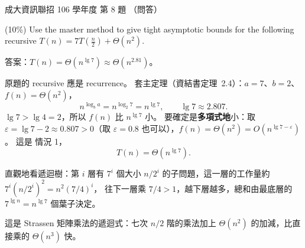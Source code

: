 \begin{pastexam}[label={px:ncku-106-prog-08}]{成大資訊聯招 106 學年度 第 8 題}
（問答）

(10\%) Use the master method to give tight asymptotic bounds for the following recursive
$T(n)=7T(\frac{n}{2})+\Theta(n^2)$.
\end{pastexam}

\begin{pastsoln}
答案：$T(n) = \Theta(n^{\lg 7}) \approx \Theta(n^{2.81})$。

原題的 recursive 應是 recurrence。 套主定理（資結書定理~2.4）：$a = 7$、$b = 2$、$f(n) = \Theta(n^2)$，
\[
n^{\log_b a} = n^{\log_2 7} = n^{\lg 7}, \qquad \lg 7 \approx 2.807 .
\]
$\lg 7 > \lg 4 = 2$，所以 $f(n)$ 比 $n^{\lg 7}$ 小。 要確定是\textbf{多項式地}小：取 $\varepsilon = \lg 7 - 2
\approx 0.807 > 0$（取 $\varepsilon = 0.8$ 也可以），$f(n) = \Theta(n^2) = O(n^{\lg 7 - \varepsilon})$。 這是
情況 1，
\[
T(n) = \Theta(n^{\lg 7}).
\]

直觀地看遞迴樹：第 $i$ 層有 $7^i$ 個大小 $n/2^i$ 的子問題，這一層的工作量約 $7^i (n/2^i)^2 = n^2 (7/4)^i$，
往下一層乘 $7/4 > 1$，越下層越多，總和由最底層的 $7^{\lg n} = n^{\lg 7}$ 個葉子決定。

這是 Strassen 矩陣乘法的遞迴式：七次 $n/2$ 階的乘法加上 $\Theta(n^2)$ 的加減，比直接乘的 $\Theta(n^3)$ 快。
\end{pastsoln}
